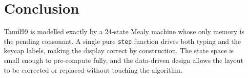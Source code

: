 \documentclass[11pt,a4paper]{article}
\begin{document}
\section{Conclusion}
Tamil99 is modelled exactly by a 24-state Mealy machine whose only memory is
the pending consonant. A single pure \texttt{step} function drives both typing
and the keycap labels, making the display correct by construction. The state
space is small enough to pre-compute fully, and the data-driven design allows
the layout to be corrected or replaced without touching the algorithm.
\end{document}
